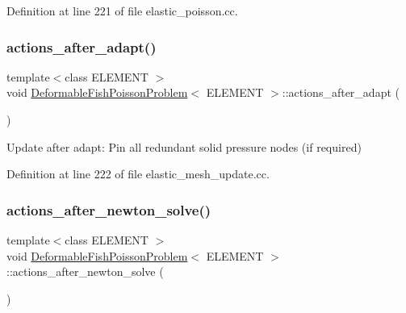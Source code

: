 Definition at line 221 of file elastic\+\_\+poisson.\+cc.

\mbox{\label{classDeformableFishPoissonProblem_ada340a31a3b019116ecb7c0bb1d4c779}} 
\subsubsection{\texorpdfstring{actions\+\_\+after\+\_\+adapt()}{actions\_after\_adapt()}\hspace{0.1cm}{\footnotesize\ttfamily [2/2]}}
{\footnotesize\ttfamily template$<$class E\+L\+E\+M\+E\+NT $>$ \\
void \hyperlink{classDeformableFishPoissonProblem}{Deformable\+Fish\+Poisson\+Problem}$<$ E\+L\+E\+M\+E\+NT $>$\+::actions\+\_\+after\+\_\+adapt (\begin{DoxyParamCaption}{ }\end{DoxyParamCaption})\hspace{0.3cm}{\ttfamily [inline]}}



Update after adapt\+: Pin all redundant solid pressure nodes (if required) 



Definition at line 222 of file elastic\+\_\+mesh\+\_\+update.\+cc.

\mbox{\label{classDeformableFishPoissonProblem_a18fdfaadd9ae10257088b9533f139182}} 
\subsubsection{\texorpdfstring{actions\+\_\+after\+\_\+newton\+\_\+solve()}{actions\_after\_newton\_solve()}\hspace{0.1cm}{\footnotesize\ttfamily [1/2]}}
{\footnotesize\ttfamily template$<$class E\+L\+E\+M\+E\+NT $>$ \\
void \hyperlink{classDeformableFishPoissonProblem}{Deformable\+Fish\+Poisson\+Problem}$<$ E\+L\+E\+M\+E\+NT $>$\+::actions\+\_\+after\+\_\+newton\+\_\+solve (\begin{DoxyParamCaption}{ }\end{DoxyParamCaption})\hspace{0.3cm}{\ttfamily [inline]}}



